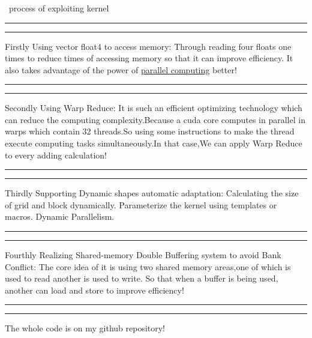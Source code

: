 \subsubsection{}~process of exploiting kernel\newline
\rule{\textwidth}{0pt}
\rule{\textwidth}{0pt}
Firstly\newline
Using vector float4 to access memory:\newline
Through reading four floats one times to reduce times of accessing memory so that it can improve efficiency.
It also takes advantage of the power of \underline{parallel computing} better!
\rule{\textwidth}{0pt}
\rule{\textwidth}{0pt}
Secondly\newline
Using Warp Reduce:\newline
It is such an efficient optimizing technology which can reduce the computing complexity.Because a cuda core
computes in parallel in warps which contain 32 threads.So using some instructions to make the thread execute
computing tasks simultaneously.In that case,We can apply Warp Reduce to every adding calculation!\newline
\rule{\textwidth}{0pt}
\rule{\textwidth}{0pt}
Thirdly\newline
Supporting Dynamic shapes automatic adaptation:\newline
Calculating the size of grid and block dynamically.
Parameterize the kernel using templates or macros.
Dynamic Parallelism.\newline
\rule{\textwidth}{0pt}
\rule{\textwidth}{0pt}
Fourthly\newline
Realizing Shared-memory Double Buffering system to avoid Bank Conflict:\newline
The core idea of it is using two shared memory areas,one of which is used to read another is used to write.
So that when a buffer is being used, another can load and store to improve efficiency!
\rule{\textwidth}{0pt}
\rule{\textwidth}{0pt}
{\LARGE The whole code is on my github repository!}
